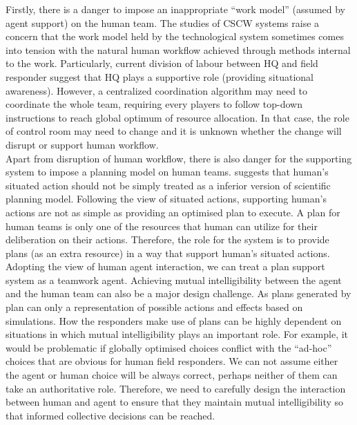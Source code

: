 Firstly, there is a danger to impose an inappropriate ``work model'' (assumed by agent support) on the human team. The studies of \ac{CSCW} systems \cite{Bowers1994} raise a concern that the work model held by the technological system sometimes comes into tension with the natural human workflow achieved through methods internal to the work. Particularly, current division of labour between HQ and field responder suggest that HQ plays a supportive role (providing situational awareness). However, a centralized coordination algorithm may need to coordinate the whole team, requiring every players to follow top-down instructions to reach global optimum of resource allocation. In that case, the role of control room may need to change and it is unknown whether the change will disrupt or support human workflow. \\

Apart from disruption of human workflow, there is also danger for the supporting system to impose a planning model on human teams. \cite{Suchman1987} suggests that human's situated action should not be simply treated as a inferior version of scientific planning model. Following the view of situated actions, supporting human's actions are not as simple as providing an optimised plan to execute. A plan for human teams is only one of the resources that human can utilize for their deliberation on their actions. Therefore, the role for the system is to provide plans (as an extra resource) in a way that support human's situated actions. \\

Adopting the view of human agent interaction, we can treat a plan support system as a teamwork agent.  Achieving mutual intelligibility between the agent and the human team can also be a major design challenge.  As plans generated by plan can only a representation of possible actions and effects based on simulations. How the responders make use of plans can be highly dependent on situations in which mutual intelligibility plays an important role. For example, it would be problematic if globally optimised choices conflict with the ``ad-hoc'' choices that are obvious for human field responders. We can not assume either the agent or human choice will be always correct, perhaps neither of them can take an authoritative role. Therefore, we need to carefully design the interaction between human and agent to ensure that they maintain mutual intelligibility so that informed collective decisions can be reached.  \\

